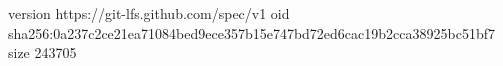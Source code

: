 version https://git-lfs.github.com/spec/v1
oid sha256:0a237c2ce21ea71084bed9ece357b15e747bd72ed6cac19b2cca38925bc51bf7
size 243705

